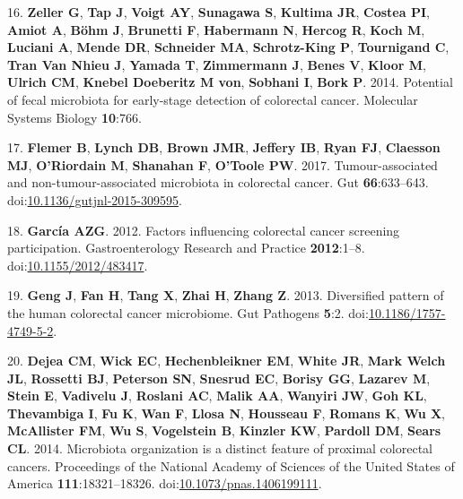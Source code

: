 \documentclass[12pt,]{article}
\begin{document}
\hypertarget{ref-zeller_potential_2014}{}
16. \textbf{Zeller G}, \textbf{Tap J}, \textbf{Voigt AY},
\textbf{Sunagawa S}, \textbf{Kultima JR}, \textbf{Costea PI},
\textbf{Amiot A}, \textbf{Böhm J}, \textbf{Brunetti F},
\textbf{Habermann N}, \textbf{Hercog R}, \textbf{Koch M},
\textbf{Luciani A}, \textbf{Mende DR}, \textbf{Schneider MA},
\textbf{Schrotz-King P}, \textbf{Tournigand C}, \textbf{Tran Van Nhieu
J}, \textbf{Yamada T}, \textbf{Zimmermann J}, \textbf{Benes V},
\textbf{Kloor M}, \textbf{Ulrich CM}, \textbf{Knebel Doeberitz M von},
\textbf{Sobhani I}, \textbf{Bork P}. 2014. Potential of fecal microbiota
for early-stage detection of colorectal cancer. Molecular Systems
Biology \textbf{10}:766.

\hypertarget{ref-flemer_tumour-associated_2017}{}
17. \textbf{Flemer B}, \textbf{Lynch DB}, \textbf{Brown JMR},
\textbf{Jeffery IB}, \textbf{Ryan FJ}, \textbf{Claesson MJ},
\textbf{O'Riordain M}, \textbf{Shanahan F}, \textbf{O'Toole PW}. 2017.
Tumour-associated and non-tumour-associated microbiota in colorectal
cancer. Gut \textbf{66}:633--643.
doi:\href{https://doi.org/10.1136/gutjnl-2015-309595}{10.1136/gutjnl-2015-309595}.

\hypertarget{ref-GimenoGarca2012}{}
18. \textbf{García AZG}. 2012. Factors influencing colorectal cancer
screening participation. Gastroenterology Research and Practice
\textbf{2012}:1--8.
doi:\href{https://doi.org/10.1155/2012/483417}{10.1155/2012/483417}.

\hypertarget{ref-geng_diversified_2013}{}
19. \textbf{Geng J}, \textbf{Fan H}, \textbf{Tang X}, \textbf{Zhai H},
\textbf{Zhang Z}. 2013. Diversified pattern of the human colorectal
cancer microbiome. Gut Pathogens \textbf{5}:2.
doi:\href{https://doi.org/10.1186/1757-4749-5-2}{10.1186/1757-4749-5-2}.

\hypertarget{ref-dejea_microbiota_2014}{}
20. \textbf{Dejea CM}, \textbf{Wick EC}, \textbf{Hechenbleikner EM},
\textbf{White JR}, \textbf{Mark Welch JL}, \textbf{Rossetti BJ},
\textbf{Peterson SN}, \textbf{Snesrud EC}, \textbf{Borisy GG},
\textbf{Lazarev M}, \textbf{Stein E}, \textbf{Vadivelu J},
\textbf{Roslani AC}, \textbf{Malik AA}, \textbf{Wanyiri JW}, \textbf{Goh
KL}, \textbf{Thevambiga I}, \textbf{Fu K}, \textbf{Wan F}, \textbf{Llosa
N}, \textbf{Housseau F}, \textbf{Romans K}, \textbf{Wu X},
\textbf{McAllister FM}, \textbf{Wu S}, \textbf{Vogelstein B},
\textbf{Kinzler KW}, \textbf{Pardoll DM}, \textbf{Sears CL}. 2014.
Microbiota organization is a distinct feature of proximal colorectal
cancers. Proceedings of the National Academy of Sciences of the United
States of America \textbf{111}:18321--18326.
doi:\href{https://doi.org/10.1073/pnas.1406199111}{10.1073/pnas.1406199111}.
\end{document}
